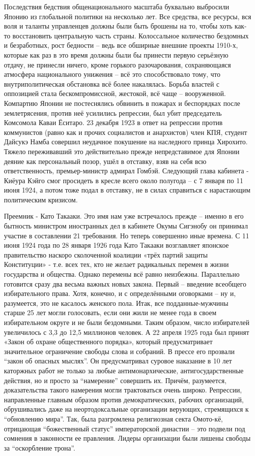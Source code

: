 Последствия бедствия общенационального масштаба буквально выбросили Японию из глобальной политики на несколько лет. Все средства, все ресурсы, вся воля и таланты управленцев должны были быть брошены на то, чтобы хоть как-то восстановить центральную часть страны. Колоссальное количество бездомных и безработных, рост бедности – ведь все обширные внешние проекты 1910-х, которые как раз в это время должны были бы принести первую серьёзную отдачу, не принесли ничего, кроме горького разочарования, сохраняющаяся атмосфера национального унижения – всё это способствовало тому, что внутриполитическая обстановка всё более накалялась. Борьба властей с оппозицией стала бескомпромиссной, жестокой, всё чаще – вооруженной. Компартию Японии не постеснялись обвинить в пожарах и беспорядках после землетрясения, против неё усилились репрессии, был убит председатель Комсомола Каваи Ёситаро. 23 декабря 1923 в ответ на репрессии против коммунистов (равно как и прочих социалистов и анархистов) член КПЯ, студент Дайсукэ Намба совершил неудачное покушение на наследного принца Хирохито. Тяжело переживавший это действительно прежде непредставимое для Японии деяние как персональный позор, ушёл в отставку, взяв на себя всю ответственность, премьер-министр адмирал Гомбэй. Следующий глава кабинета - Киёура Кэйго смог просидеть в кресле всего около полугода – с 7 января по 11 июня 1924, а потом тоже подал в отставку, не в силах справиться с нарастающим политическим кризисом.

Преемник - Като Такааки. Это имя нам уже встречалось прежде – именно в его бытность министром иностранных дел в кабинете Окумы Сигэнобу он принимал участие в составлении 21 требования. Но теперь совершенно иные времена. С 11 июня 1924 года по 28 января 1926 года Като Такааки возглавляет японское правительство наскоро сколоченной коалиции «трёх партий защиты Конституции» - т.е. всех тех, кто не желает радикальных перемен в жизни государства и общества. Однако перемены всё равно неизбежны. Параллельно готовится сразу два весьма важных новых закона. Первый – введение всеобщего избирательного права. Хотя, конечно, и с определёнными оговорками – ну и, разумеется, это не касалось женского пола. Итак, все подданные-мужчины старше 25 лет могли голосовать, если они жили не менее года в своем избирательном округе и не были бездомными. Таким образом, число избирателей увеличилось с 3,3 до 12,5 миллионов человек. А 22 апреля 1925 года был принят «Закон об охране общественного порядка», который предусматривает значительное ограничение свободы слова и собраний. В прессе его прозвали “закон об опасных мыслях”. Он предусматривал суровое наказание в 10 лет каторжных работ не только за любые антимонархические, антигосударственные действия, но и просто за “намерение” совершить их. Причём, разумеется, доказательства такого намерения могли трактоваться очень широко. Репрессии, направленные главным образом против демократических, рабочих организаций, обрушивались даже на неортодоксальные организации верующих, стремящихся к “обновлению мира”. Так, была разгромлена религиозная секта Омото-кё, отрицающая “божественный статус” императорской династии – это подвели под сомнения в законности ее правления. Лидеры организации были лишены свободы за “оскорбление трона”.

